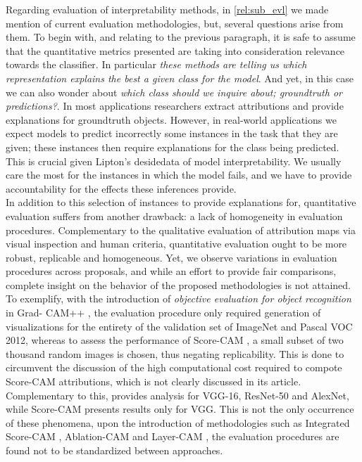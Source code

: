 \noindent Regarding evaluation of interpretability methods, in \autoref{rel:sub_evl} we made mention 
of current evaluation methodologies, but, several questions arise from them. To begin with, and                                                                                                          
relating to the previous paragraph, it is safe to assume that the quantitative metrics presented 
are taking into consideration relevance towards the classifier. In particular \emph{these 
methods are telling us which representation explains the best a given class for the model}. 
And yet, in this case we can also wonder about \emph{which class should we inquire about; 
groundtruth or predictions?}. In most applications researchers extract attributions and provide 
explanations for groundtruth objects. However, in real-world applications we expect models to 
predict incorrectly some instances in the task that they are given; these instances then require 
explanations for the class being predicted. This is crucial given Lipton's desidedata of model 
interpretability. We usually care the most for the instances in which the model fails, and we have 
to provide accountability for the effects these inferences provide. \\

\noindent In addition to this selection of instances to provide explanations for, quantitative 
evaluation suffers from another drawback: a lack of homogeneity in evaluation procedures. 
Complementary to the qualitative evaluation of attribution maps via visual inspection and human 
criteria, quantitative evaluation ought to be more robust, replicable and homogeneous. Yet, we 
observe variations in evaluation procedures across proposals, and while an effort to provide fair 
comparisons, complete insight on the behavior of the proposed methodologies is not attained. 
To exemplify, with the introduction of \emph{objective evaluation for object recognition} in Grad-
CAM++ \autocite{chattopadhay2018grad}, the evaluation procedure only required generation of 
visualizations for the entirety of the validation set of ImageNet and Pascal VOC 2012, whereas 
to assess the performance of Score-CAM \autocite{wang2020score}, a small subset of two thousand 
random images is chosen, thus negating replicability. This is done to circumvent the 
discussion of the high computational cost required to compote Score-CAM attributions, which is  
not clearly discussed in its article. Complementary to this, 
\cite{chattopadhay2018grad} provides analysis for VGG-16, ResNet-50 and AlexNet, while Score-CAM 
presents results only for VGG.  This is not the only occurrence of these phenomena, upon the 
introduction of methodologies such as Integrated Score-CAM \autocite{naidu2020cam}, Ablation-CAM
\autocite{ablationcam} and Layer-CAM \autocite{jiang2021layercam}, the evaluation procedures are 
found not to be standardized between approaches.\\

